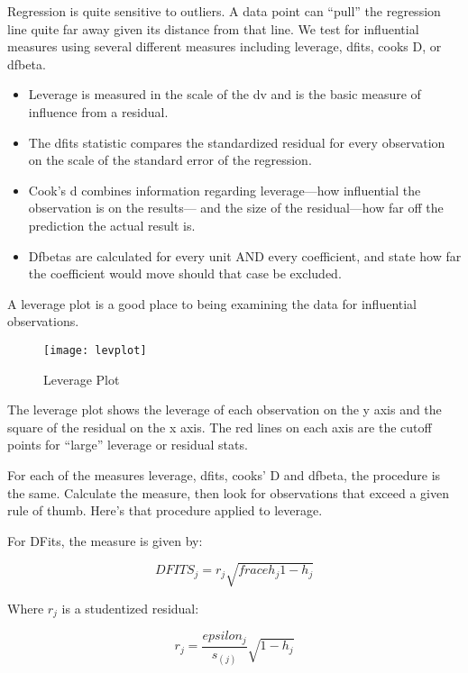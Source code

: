 \documentclass[12pt]{article}
\begin{document}
Regression is quite sensitive to outliers. A data point can ``pull''
the regression line quite far away given its distance from that
line. We test for influential measures using several different
measures including 
leverage, dfits, cooks D, or dfbeta.

\begin{itemize}
\item Leverage is measured in the scale of the dv and is the basic
  measure of influence from a residual.

\item The dfits statistic compares the standardized residual for every
  observation on the scale of the standard error of the regression. 

\item Cook's d combines information regarding leverage---how
  influential the observation is on the results--- and the size of the
  residual---how far off the prediction the actual result is. 

\item Dfbetas are calculated for every unit AND every coefficient, and
  state how far the coefficient would move should that case be
  excluded. 

\end{itemize}

A leverage plot is a good place to being examining the data for
influential observations.

\begin{figure}[ht!]
  \centering
  \caption{Leverage Plot}  
\texttt{[image: levplot]}
  \label{fig:levplot}
\end{figure}

The leverage plot shows the leverage of each observation on the y axis
and the square of the residual on the x axis. The red lines on each
axis are the cutoff points for ``large'' leverage or residual stats. 

For each of the measures leverage, dfits, cooks' D and dfbeta, the
procedure is the same. Calculate the measure, then look for
observations that exceed a given rule of thumb. Here's that procedure
applied to leverage. 

For DFits, the measure is given by:

\begin{equation*}
  DFITS_j=r_j\sqrt{frace{h_j}{1-h_j}}
\end{equation*}

Where $r_j$ is a studentized residual:

\begin{equation*}
  r_j=\frac{epsilon_j}{s_{(j)}}\sqrt{1-h_j}
\end{equation*}
\end{document}

